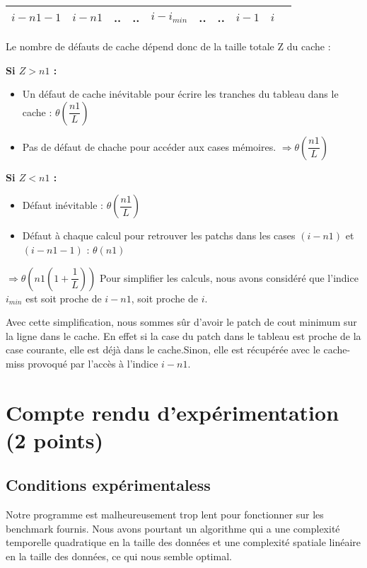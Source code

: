 \documentclass[a4paper, 10pt, french]{article}
\begin{document}
    \begin{tabular}{|c|c|c|c|c|c|c|c|c|c|}
    	\hline

    	 $i - n1 - 1$ & $i - n1$  &  .. & .. & $i - i_{min}$ & .. & .. & $i - 1$ & $i$ \\

    	\hline
    \end{tabular}

	Le nombre de défauts de cache dépend donc de la taille totale Z du cache :

	\textbf{Si $Z > n1$ :}
    \begin{itemize}
		 \item Un défaut de cache inévitable pour écrire les tranches du tableau dans le cache : $\theta(\dfrac{n1}{L})$
		 \item Pas de défaut de chache pour accéder aux cases mémoires.
		 $\Rightarrow \theta(\dfrac{n1}{L})$
     \end{itemize}

	\textbf{Si $Z < n1$ :}
    \begin{itemize}
	    \item Défaut inévitable : $\theta(\dfrac{n1}{L})$
	    \item Défaut à chaque calcul pour retrouver les patchs dans les cases $(i - n1)$ et  $(i - n1 - 1)$ : $\theta(n1)$
    \end{itemize}

 	$\Rightarrow \theta(n1 (1 + \dfrac{1}{L}) )$
 	Pour simplifier les calculs, nous avons considéré que l'indice $i_{min}$ est soit proche de $i - n1$, soit proche de $i$.

 	Avec cette simplification, nous sommes sûr d'avoir le patch de cout minimum sur la ligne dans le cache. En effet si la case du patch dans
 	le tableau est proche
 	de la case courante,  elle est déjà dans le cache.Sinon, elle est récupérée avec le cache-miss provoqué par l'accès à l'indice
 	$i - n1$.

\section{Compte rendu d'expérimentation (2 points)}
  \subsection{Conditions expérimentaless}
    Notre programme est malheureusement trop lent pour fonctionner sur les benchmark fournis.
    Nous avons pourtant un algorithme qui a une complexité temporelle quadratique
    en la taille des données et une complexité spatiale linéaire en la taille des données,
    ce qui nous semble optimal.
\end{document}
